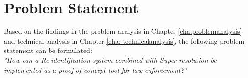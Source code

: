 \chapter{Problem Statement} \label{cha: problemstatement}

Based on the findings in the problem analysis in Chapter \ref{cha:problemanalysis} and technical analysis in Chapter \ref{cha: technicalanalysis}, the following problem statement can be formulated:
\\

\textit{"How can a Re-identification system combined with Super-resolution be implemented as a proof-of-concept tool for law enforcement?"}